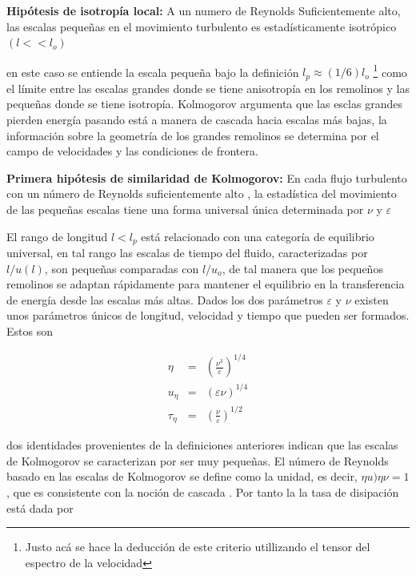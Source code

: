 \medskip

\hangindent=0.7cm \textbf{Hipótesis de isotropía local: } A un numero de Reynolds Suficientemente alto, las escalas pequeñas en el movimiento turbulento es estadísticamente isotrópico $(l<<l_{o})$

\noindent en este caso se entiende la escala pequeña bajo la definición $l_{p} \approx (1/6)l_{o}$ \cite{pope}\footnote{Justo acá se hace la deducción de este criterio utillizando el tensor del espectro de la velocidad} como el límite entre las escalas grandes donde se tiene anisotropía en los remolinos y las pequeñas donde se tiene isotropía. Kolmogorov argumenta que las esclas grandes pierden energía pasando está a manera de cascada hacia escalas más bajas, la información sobre la geometría de los grandes remolinos se determina por el campo de velocidades y las condiciones de frontera. 

\medskip

\hangindent=0.7cm \textbf{Primera hipótesis de similaridad de Kolmogorov: }En cada flujo turbulento con un número de Reynolds suficientemente alto , la estadística del movimiento de las pequeñas escalas tiene una forma universal única determinada por $\nu$ y $\varepsilon$

\medskip

\noindent El rango de longitud $l<l_{p}$ está relacionado con una categoría de equilibrio universal, en tal rango las escalas de tiempo del fluido, caracterizadas por $l/u(l)$, son pequeñas comparadas con $l/u_{o}$, de tal manera que los pequeños remolinos se adaptan rápidamente para mantener el equilibrio en la transferencia de energía desde las escalas más altas. Dados los dos parámetros $\varepsilon$ y $\nu$  existen unos parámetros únicos de longitud, velocidad y tiempo que pueden ser formados. Estos son

\begin{eqnarray}
\eta &=& \left(\frac{\nu^{3}}{\varepsilon}\right)^{1/4}\\
u_{\eta} &=& (\varepsilon\nu)^{1/4}\\
\tau_{\eta}&=&\left(\frac{\nu}{\varepsilon}\right)^{1/2}
\end{eqnarray}

\noindent dos identidades provenientes de la definiciones anteriores indican que las escalas de Kolmogorov se caracterizan por ser muy pequeñas. El número de Reynolds basado en las escalas de Kolmogorov se define como la unidad, es decir, $\eta u){\eta}\nu=1$, que es consistente con la noción de cascada . Por tanto la la tasa de disipación está dada por 

